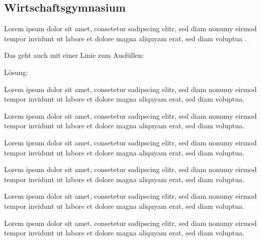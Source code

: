 \documentclass[
parindent=false,
parskip=true,
parts=true,
colortheme=wu,
styletheme=wu,
shownotess=true,
showresults=false
]{edu}
\begin{document}
\newpage

\subsection{Wirtschaftsgymnasium}


\label{testlabel}

Lorem ipsum dolor sit amet, consetetur sadipscing elitr, sed diam nonumy eirmod tempor invidunt ut labore et dolore magna aliquyam erat, sed diam voluptua .


Das geht auch mit einer Linie zum Ausfüllen:

Lösung:

\begin{definition}[Monotonie]
	Lorem ipsum dolor sit amet, consetetur sadipscing elitr, sed diam nonumy eirmod tempor invidunt ut labore et dolore magna aliquyam erat, sed diam voluptua.
\end{definition}

	Lorem ipsum dolor sit amet, consetetur sadipscing elitr, sed diam nonumy eirmod tempor invidunt ut labore et dolore magna aliquyam erat, sed diam voluptua.

\begin{example}
	Lorem ipsum dolor sit amet, consetetur sadipscing elitr, sed diam nonumy eirmod tempor invidunt ut labore et dolore magna aliquyam erat, sed diam voluptua.
\end{example}

\begin{examplef}
	Lorem ipsum dolor sit amet, consetetur sadipscing elitr, sed diam nonumy eirmod tempor invidunt ut labore et dolore magna aliquyam erat, sed diam voluptua.
\end{examplef}

\begin{exampleexe}
	Lorem ipsum dolor sit amet, consetetur sadipscing elitr, sed diam nonumy eirmod tempor invidunt ut labore et dolore magna aliquyam erat, sed diam voluptua.
\end{exampleexe}

\begin{exampleexef}
	Lorem ipsum dolor sit amet, consetetur sadipscing elitr, sed diam nonumy eirmod tempor invidunt ut labore et dolore magna aliquyam erat, sed diam voluptua.
\end{exampleexef}
\end{document}
